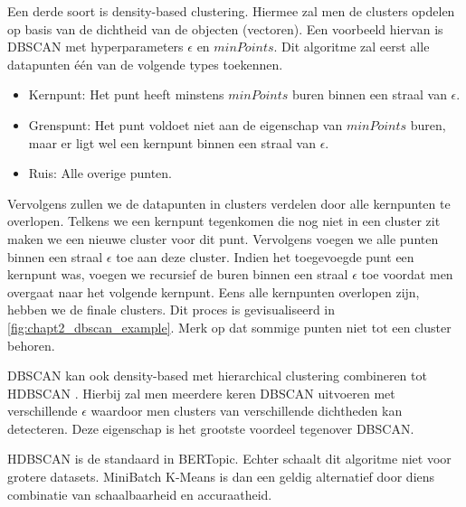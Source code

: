 

Een derde soort is density-based clustering. Hiermee zal men de clusters opdelen op basis van de dichtheid van de objecten (vectoren). Een voorbeeld hiervan is DBSCAN met hyperparameters $\epsilon$ en $minPoints$. Dit algoritme zal eerst alle datapunten één van de volgende types toekennen.

\begin{itemize}
    \item Kernpunt: Het punt heeft minstens $minPoints$ buren binnen een straal van $\epsilon$.
    \item Grenspunt: Het punt voldoet niet aan de eigenschap van $minPoints$ buren, maar er ligt wel een kernpunt binnen een straal van $\epsilon$.
    \item Ruis: Alle overige punten.
\end{itemize}

Vervolgens zullen we de datapunten in clusters verdelen door alle kernpunten te overlopen. Telkens we een kernpunt tegenkomen die nog niet in een cluster zit maken we een nieuwe cluster voor dit punt. Vervolgens voegen we alle punten binnen een straal $\epsilon$ toe aan deze cluster. Indien het toegevoegde punt een kernpunt was, voegen we recursief de buren binnen een straal $\epsilon$ toe voordat men overgaat naar het volgende kernpunt. Eens alle kernpunten overlopen zijn, hebben we de finale clusters. Dit proces is gevisualiseerd in \autoref{fig:chapt2_dbscan_example}. Merk op dat sommige punten niet tot een cluster behoren.


DBSCAN kan ook density-based met hierarchical clustering combineren tot HDBSCAN \cite{hdbscan_paper}. Hierbij zal men meerdere keren DBSCAN uitvoeren met verschillende $\epsilon$ waardoor men clusters van verschillende dichtheden kan detecteren. Deze eigenschap is het grootste voordeel tegenover DBSCAN.

HDBSCAN is de standaard in BERTopic. Echter schaalt dit algoritme niet voor grotere datasets. MiniBatch K-Means is dan een geldig alternatief door diens combinatie van schaalbaarheid en accuraatheid.

